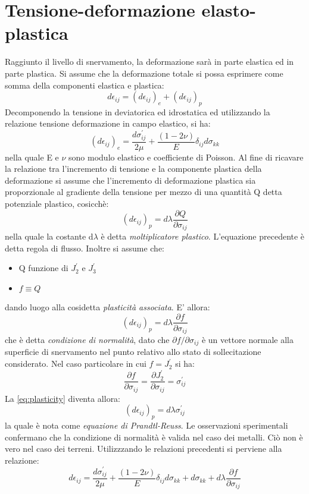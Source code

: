 \section{Tensione-deformazione elasto-plastica}
Raggiunto il livello di snervamento, la deformazione sarà in parte elastica ed in parte plastica. Si assume che la deformazione totale si possa esprimere come somma della componenti elastica e plastica:
\begin{equation}
	d \epsilon_{ij} = (d \epsilon_{ij})_e + (d \epsilon_{ij})_p
\end{equation}
Decomponendo la tensione in deviatorica ed idrostatica ed utilizzando la relazione tensione deformazione in campo elastico, si ha:
\begin{equation}
	(d \epsilon_{ij})_e = \frac{d \sigma_{ij}^{'}}{2 \mu} + \frac{(1-2 \nu)}{E}\delta_{ij} d\sigma_{kk}
\end{equation}
nella quale E e $\nu$ sono modulo elastico e coefficiente di Poisson. Al fine di ricavare la relazione tra l'incremento di tensione e la componente plastica della deformazione si assume che l'incremento di deformazione plastica sia proporzionale
al gradiente della tensione per mezzo di una quantità Q detta potenziale plastico, cosicchè:
\begin{equation}
	(d\epsilon_{ij})_p = d \lambda \frac{\partial Q}{\partial \sigma_{ij}}
\end{equation}
nella quale la costante d$\lambda$ è detta \textit{moltiplicatore plastico}. L'equazione precedente è detta regola di flusso. 
Inoltre si assume che:
\begin{itemize}
	\item Q funzione di $J_2^{'}$ e $J_3^{'}$
	\item  $f \equiv Q$
\end{itemize}
dando luogo alla cosidetta  \emph{plasticità associata}. E' allora:
\begin{equation}
	(d\epsilon_{ij})_p = d \lambda \frac{\partial f}{\partial \sigma_{ij}}
	\label{eq:plasticity}
\end{equation}
che è detta \emph{condizione di normalità}, dato che $\partial f/ \partial \sigma_{ij}$ è un vettore normale alla superficie di snervamento nel punto relativo allo stato di sollecitazione considerato. Nel caso particolare in cui $f = J^{'}_2$ si ha:
\begin{equation}
	\frac{\partial f}{\partial \sigma_{ij}} = \frac{\partial J^{'}_2}{\partial \sigma_{ij}} = \sigma_{ij}^{'}
\end{equation}
La \ref{eq:plasticity} diventa allora:
\begin{equation}
	(d\epsilon_{ij})_p = d \lambda \sigma_{ij}^{'}
\end{equation}
la quale è nota come \emph{equazione di Prandtl-Reuss}. Le osservazioni sperimentali confermano che la condizione di normalità è valida nel caso dei metalli. Ciò non è vero nel caso dei terreni.
Utilizzzando le relazioni  precedenti si perviene alla relazione:
\begin{equation}
	d \epsilon_{ij} = \frac{d \sigma_{ij}^{'}}{2 \mu} + \frac{(1-2\nu)}{E} \delta_{ij} d\sigma_{kk}+ d \sigma_{kk} + d \lambda \frac{\partial f}{\partial \sigma_{ij} }
\end{equation}

